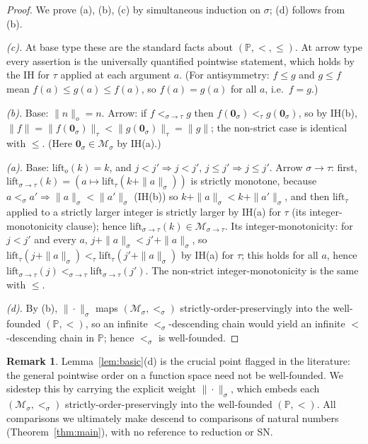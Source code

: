 \documentclass{amsart}
\theoremstyle{definition}
\newtheorem{remark}{Remark}
\begin{document}
\begin{proof}
We prove (a), (b), (c) by simultaneous induction on $\sigma$; (d) follows from (b).

\emph{(c).} At base type these are the standard facts about $(\mathbb P,<,\le)$. At arrow
type every assertion is the universally quantified pointwise statement, which holds by the
IH for $\tau$ applied at each argument $a$. (For antisymmetry: $f\le g$ and $g\le f$ mean
$f(a)\le g(a)\le f(a)$, so $f(a)=g(a)$ for all $a$, i.e.\ $f=g$.)

\emph{(b).} Base: $\|n\|_o=n$. Arrow: if $f<_{\sigma\to\tau}g$ then
$f(\mathbf 0_\sigma)<_\tau g(\mathbf 0_\sigma)$, so by IH(b),
$\|f\|=\|f(\mathbf 0_\sigma)\|_\tau<\|g(\mathbf 0_\sigma)\|_\tau=\|g\|$; the non-strict case
is identical with $\le$. (Here $\mathbf 0_\sigma\in\mathcal M_\sigma$ by IH(a).)

\emph{(a).} Base: $\mathrm{lift}_o(k)=k$, and $j<j'\Rightarrow j<j'$, $j\le j'\Rightarrow
j\le j'$. Arrow $\sigma\to\tau$: first, $\mathrm{lift}_{\sigma\to\tau}(k)=
(a\mapsto\mathrm{lift}_\tau(k+\|a\|_\sigma))$ is strictly monotone, because
$a<_\sigma a'\Rightarrow\|a\|_\sigma<\|a'\|_\sigma$ (IH(b)) so $k+\|a\|_\sigma<k+\|a'\|_\sigma$,
and then $\mathrm{lift}_\tau$ applied to a strictly larger integer is strictly larger by IH(a)
for $\tau$ (its integer-monotonicity clause); hence
$\mathrm{lift}_{\sigma\to\tau}(k)\in\mathcal M_{\sigma\to\tau}$. Its integer-monotonicity:
for $j<j'$ and every $a$, $j+\|a\|_\sigma<j'+\|a\|_\sigma$, so
$\mathrm{lift}_\tau(j+\|a\|_\sigma)<_\tau\mathrm{lift}_\tau(j'+\|a\|_\sigma)$ by IH(a) for
$\tau$; this holds for all $a$, hence $\mathrm{lift}_{\sigma\to\tau}(j)<_{\sigma\to\tau}
\mathrm{lift}_{\sigma\to\tau}(j')$. The non-strict integer-monotonicity is the same with
$\le$.

\emph{(d).} By (b), $\|\cdot\|_\sigma$ maps $(\mathcal M_\sigma,<_\sigma)$
strictly-order-preservingly into the well-founded $(\mathbb P,<)$, so an infinite
$<_\sigma$-descending chain would yield an infinite $<$-descending chain in $\mathbb P$;
hence $<_\sigma$ is well-founded.
\end{proof}

\begin{remark}
Lemma~\ref{lem:basic}(d) is the crucial point flagged in the literature: the general
pointwise order on a function space need not be well-founded. We sidestep this by carrying
the explicit weight $\|\cdot\|_\sigma$, which embeds each $(\mathcal M_\sigma,<_\sigma)$
strictly-order-preservingly into the well-founded $(\mathbb P,<)$. All comparisons we
ultimately make descend to comparisons of natural numbers (Theorem~\ref{thm:main}), with no
reference to reduction or SN.
\end{remark}
\end{document}
